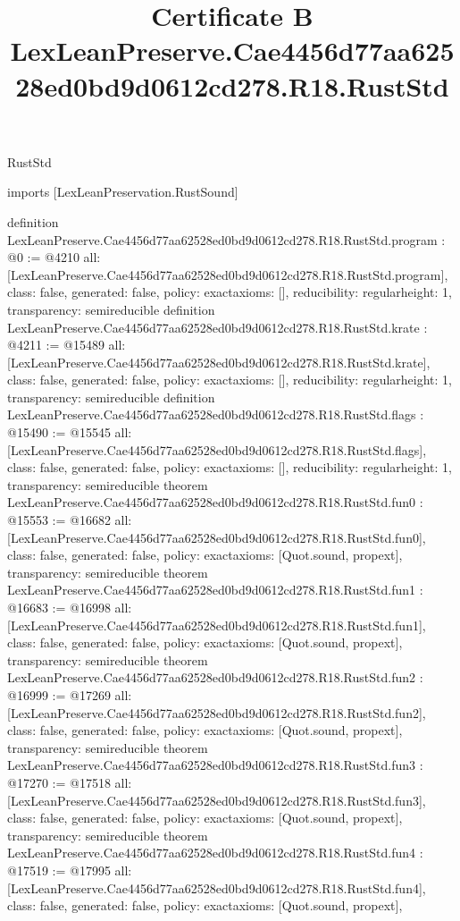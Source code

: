 \begin{lexlean}{RustStd}
\title{Certificate B LexLeanPreserve.Cae4456d77aa62528ed0bd9d0612cd278.R18.RustStd}
\begin{coremodule}
imports [LexLeanPreservation.RustSound]

definition LexLeanPreserve.Cae4456d77aa62528ed0bd9d0612cd278.R18.RustStd.program : @0 := @4210 {
  all: [LexLeanPreserve.Cae4456d77aa62528ed0bd9d0612cd278.R18.RustStd.program],
  class: false,
  generated: false,
  policy: exact{axioms: []},
  reducibility: regular{height: 1},
  transparency: semireducible
}
definition LexLeanPreserve.Cae4456d77aa62528ed0bd9d0612cd278.R18.RustStd.krate : @4211 := @15489 {
  all: [LexLeanPreserve.Cae4456d77aa62528ed0bd9d0612cd278.R18.RustStd.krate],
  class: false,
  generated: false,
  policy: exact{axioms: []},
  reducibility: regular{height: 1},
  transparency: semireducible
}
definition LexLeanPreserve.Cae4456d77aa62528ed0bd9d0612cd278.R18.RustStd.flags : @15490 := @15545 {
  all: [LexLeanPreserve.Cae4456d77aa62528ed0bd9d0612cd278.R18.RustStd.flags],
  class: false,
  generated: false,
  policy: exact{axioms: []},
  reducibility: regular{height: 1},
  transparency: semireducible
}
theorem LexLeanPreserve.Cae4456d77aa62528ed0bd9d0612cd278.R18.RustStd.fun0 : @15553 := @16682 {
  all: [LexLeanPreserve.Cae4456d77aa62528ed0bd9d0612cd278.R18.RustStd.fun0],
  class: false,
  generated: false,
  policy: exact{axioms: [Quot.sound, propext]},
  transparency: semireducible
}
theorem LexLeanPreserve.Cae4456d77aa62528ed0bd9d0612cd278.R18.RustStd.fun1 : @16683 := @16998 {
  all: [LexLeanPreserve.Cae4456d77aa62528ed0bd9d0612cd278.R18.RustStd.fun1],
  class: false,
  generated: false,
  policy: exact{axioms: [Quot.sound, propext]},
  transparency: semireducible
}
theorem LexLeanPreserve.Cae4456d77aa62528ed0bd9d0612cd278.R18.RustStd.fun2 : @16999 := @17269 {
  all: [LexLeanPreserve.Cae4456d77aa62528ed0bd9d0612cd278.R18.RustStd.fun2],
  class: false,
  generated: false,
  policy: exact{axioms: [Quot.sound, propext]},
  transparency: semireducible
}
theorem LexLeanPreserve.Cae4456d77aa62528ed0bd9d0612cd278.R18.RustStd.fun3 : @17270 := @17518 {
  all: [LexLeanPreserve.Cae4456d77aa62528ed0bd9d0612cd278.R18.RustStd.fun3],
  class: false,
  generated: false,
  policy: exact{axioms: [Quot.sound, propext]},
  transparency: semireducible
}
theorem LexLeanPreserve.Cae4456d77aa62528ed0bd9d0612cd278.R18.RustStd.fun4 : @17519 := @17995 {
  all: [LexLeanPreserve.Cae4456d77aa62528ed0bd9d0612cd278.R18.RustStd.fun4],
  class: false,
  generated: false,
  policy: exact{axioms: [Quot.sound, propext]},
}
\end{coremodule}
\end{lexlean}

